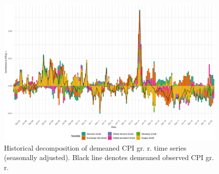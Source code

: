 \documentclass[12pt, a4paper]{extarticle}
\begin{document}
\begin{figure}
	\centering
	\includegraphics[width=0.95\linewidth]{figures/hd_st_full}
	\caption[]{Historical decomposition of demeaned CPI gr. r. time series (seasonally adjusted). Black line denotes demeaned observed CPI gr. r.}
	\label{fig:hd_full}
\end{figure}


~\\
\clearpage
\newpage
\pagebreak
\end{document}
